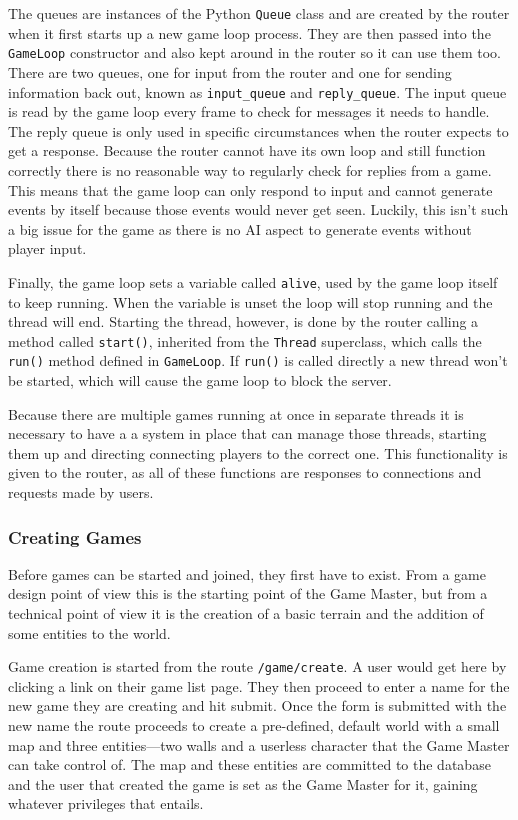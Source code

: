 The queues are instances of the Python \texttt{Queue} class and are created by the router when it first starts up a new game loop process. They are then passed into the \texttt{GameLoop} constructor and also kept around in the router so it can use them too. There are two queues, one for input from the router and one for sending information back out, known as \texttt{input\_queue} and \texttt{reply\_queue}. The input queue is read by the game loop every frame to check for messages it needs to handle. The reply queue is only used in specific circumstances when the router expects to get a response. Because the router cannot have its own loop and still function correctly there is no reasonable way to regularly check for replies from a game. This means that the game loop can only respond to input and cannot generate events by itself because those events would never get seen. Luckily, this isn't such a big issue for the game as there is no AI aspect to generate events without player input.

Finally, the game loop sets a variable called \texttt{alive}, used by the game loop itself to keep running. When the variable is unset the loop will stop running and the thread will end. Starting the thread, however, is done by the router calling a method called \texttt{start()}, inherited from the \texttt{Thread} superclass, which calls the \texttt{run()} method defined in \texttt{GameLoop}.  If \texttt{run()} is called directly a new thread won't be started, which will cause the game loop to block the server.

Because there are multiple games running at once in separate threads it is necessary to have a a system in place that can manage those threads, starting them up and directing connecting players to the correct one. This functionality is given to the router, as all of these functions are responses to connections and requests made by users.

\subsubsection{Creating Games}
Before games can be started and joined, they first have to exist. From a game design point of view this is the starting point of the Game Master, but from a technical point of view it is the creation of a basic terrain and the addition of some entities to the world.

Game creation is started from the route \texttt{/game/create}. A user would get here by clicking a link on their game list page. They then proceed to enter a name for the new game they are creating and hit submit. Once the form is submitted with the new name the route proceeds to create a pre-defined, default world with a small map and three entities---two walls and a userless character that the Game Master can take control of. The map and these entities are committed to the database and the user that created the game is set as the Game Master for it, gaining whatever privileges that entails.

